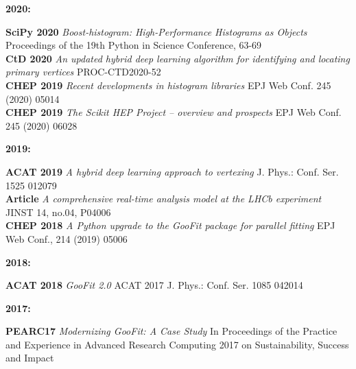 \documentclass[10pt,letterpaper]{moderncv}
\begin{document}
\begin{minipage}[t]{.065\textwidth}
\textbf{2020:}
\end{minipage}%
\begin{minipage}[t]{.935\textwidth}
\textbf{SciPy 2020} \emph{Boost-histogram: High-Performance Histograms as Objects} Proceedings of the 19th Python in Science Conference, 63-69 \\
\textbf{CtD 2020}   \emph{An updated hybrid deep learning algorithm for identifying and locating primary vertices} PROC-CTD2020-52 \\
\textbf{CHEP 2019}  \emph{Recent developments in histogram libraries} EPJ Web Conf. 245 (2020) 05014 \\
\textbf{CHEP 2019}  \emph{The Scikit HEP Project -- overview and prospects} EPJ Web Conf. 245 (2020) 06028
\end{minipage}

\begin{minipage}[t]{.065\textwidth}
\textbf{2019:}
\end{minipage}%
\begin{minipage}[t]{.935\textwidth}
\textbf{ACAT 2019} \emph{A hybrid deep learning approach to vertexing} J. Phys.: Conf. Ser. 1525 012079 \\
\textbf{Article}   \emph{A comprehensive real-time analysis model at the LHCb experiment} JINST 14, no.04, P04006 \\
\textbf{CHEP 2018} \emph{A Python upgrade to the GooFit package for parallel fitting} EPJ Web Conf., 214 (2019) 05006
\end{minipage}

\begin{minipage}[t]{.065\textwidth}
\textbf{2018:}
\end{minipage}%
\begin{minipage}[t]{.935\textwidth}
\textbf{ACAT 2018} \emph{GooFit 2.0} ACAT 2017 J. Phys.: Conf. Ser. 1085 042014
\end{minipage}

\begin{minipage}[t]{.065\textwidth}
\textbf{2017:}
\end{minipage}%
\begin{minipage}[t]{.935\textwidth}
\textbf{PEARC17} \emph{Modernizing GooFit: A Case Study} In Proceedings of the Practice and Experience in Advanced Research Computing 2017 on Sustainability, Success and Impact
\end{minipage}

\end{document}
